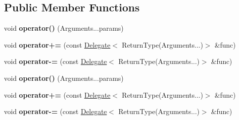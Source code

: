 \subsection*{Public Member Functions}
\begin{DoxyCompactItemize}
\item 
void {\bfseries operator()} (Arguments...\+params)\hypertarget{class_ensum_1_1_utils_1_1_event_3_01_return_type_07_arguments_8_8_8_08_4_aaafdcbad1f78eb94cd611b4e759b57ba}{}\label{class_ensum_1_1_utils_1_1_event_3_01_return_type_07_arguments_8_8_8_08_4_aaafdcbad1f78eb94cd611b4e759b57ba}

\item 
void {\bfseries operator+=} (const \hyperlink{class_ensum_1_1_utils_1_1_delegate}{Delegate}$<$ Return\+Type(Arguments...)$>$ \&func)\hypertarget{class_ensum_1_1_utils_1_1_event_3_01_return_type_07_arguments_8_8_8_08_4_a06a87b057fbf7a44c57f398a4352aa73}{}\label{class_ensum_1_1_utils_1_1_event_3_01_return_type_07_arguments_8_8_8_08_4_a06a87b057fbf7a44c57f398a4352aa73}

\item 
void {\bfseries operator-\/=} (const \hyperlink{class_ensum_1_1_utils_1_1_delegate}{Delegate}$<$ Return\+Type(Arguments...)$>$ \&func)\hypertarget{class_ensum_1_1_utils_1_1_event_3_01_return_type_07_arguments_8_8_8_08_4_ad30c7d74a04c6e1a053f02f4576b8117}{}\label{class_ensum_1_1_utils_1_1_event_3_01_return_type_07_arguments_8_8_8_08_4_ad30c7d74a04c6e1a053f02f4576b8117}

\item 
void {\bfseries operator()} (Arguments...\+params)\hypertarget{class_ensum_1_1_utils_1_1_event_3_01_return_type_07_arguments_8_8_8_08_4_aaafdcbad1f78eb94cd611b4e759b57ba}{}\label{class_ensum_1_1_utils_1_1_event_3_01_return_type_07_arguments_8_8_8_08_4_aaafdcbad1f78eb94cd611b4e759b57ba}

\item 
void {\bfseries operator+=} (const \hyperlink{class_ensum_1_1_utils_1_1_delegate}{Delegate}$<$ Return\+Type(Arguments...)$>$ \&func)\hypertarget{class_ensum_1_1_utils_1_1_event_3_01_return_type_07_arguments_8_8_8_08_4_a06a87b057fbf7a44c57f398a4352aa73}{}\label{class_ensum_1_1_utils_1_1_event_3_01_return_type_07_arguments_8_8_8_08_4_a06a87b057fbf7a44c57f398a4352aa73}

\item 
void {\bfseries operator-\/=} (const \hyperlink{class_ensum_1_1_utils_1_1_delegate}{Delegate}$<$ Return\+Type(Arguments...)$>$ \&func)\hypertarget{class_ensum_1_1_utils_1_1_event_3_01_return_type_07_arguments_8_8_8_08_4_ad30c7d74a04c6e1a053f02f4576b8117}{}\label{class_ensum_1_1_utils_1_1_event_3_01_return_type_07_arguments_8_8_8_08_4_ad30c7d74a04c6e1a053f02f4576b8117}

\end{DoxyCompactItemize}
